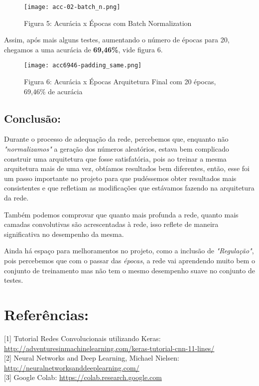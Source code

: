 \begin{figure}[ht]
\centering
\texttt{[image: acc-02-batch\_n.png]}
\caption{Figura 5: Acurácia x Épocas com Batch Normalization}
\end{figure}


Assim, após mais alguns testes, aumentando o número de épocas para 20,
chegamos a uma acurácia de \textbf{69,46\%}, vide figura 6.

\begin{figure}[H]
\centering
\texttt{[image: acc6946-padding\_same.png]}
\caption{Figura 6: Acurácia x Épocas Arquitetura Final com 20 épocas, 69,46\% de acurácia}
\end{figure}


    \subsection{Conclusão:}\label{conclusao}

Durante o processo de adequação da rede, percebemos que, enquanto não \emph{"normalizamos"}
a geração dos números aleatórios, estava bem complicado construir uma arquitetura
que fosse satisfatória, pois ao treinar a mesma arquitetura mais de uma vez, obtíamos
resultados bem diferentes, então, esse foi um passo importante no projeto para que
pudéssemos obter resultados mais consistentes e que refletiam as modificações que
estávamos fazendo na arquitetura da rede.

Também podemos comprovar que quanto mais profunda a rede, quanto mais camadas convolutivas
são acrescentadas à rede, isso reflete de maneira significativa no desempenho da mesma.

Ainda há espaço para melhoramentos no projeto, como a inclusão de \emph{"Regulação"}, pois
percebemos que com o passar das \emph{épocas}, a rede vai aprendendo muito bem o conjunto
de treinamento mas não tem o mesmo desempenho suave no conjunto de testes.


    \section{Referências:}\label{referencias}

[1] Tutorial Redes Convolucionais utilizando
Keras:
\href{http://adventuresinmachinelearning.com/keras-tutorial-cnn-11-lines/}{
http://adventuresinmachinelearning.com/keras-tutorial-cnn-11-lines/}\\

[2] Neural Networks and Deep Learning, Michael Nielsen:
\href{http://neuralnetworksanddeeplearning.com/}{http://neuralnetworksanddeeplearning.com/}\\

[3] Google Colab:
\href{https://colab.research.google.com}{https://colab.research.google.com}

    
